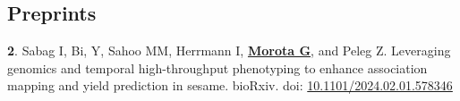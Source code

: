 \documentclass[margin,line,10pt]{res}
\newenvironment{list1}{
  \begin{list}{\ding{113}}{%
      \setlength{\itemsep}{0in}
      \setlength{\parsep}{0in} \setlength{\parskip}{0in}
      \setlength{\topsep}{0in} \setlength{\partopsep}{0in} 
      \setlength{\leftmargin}{0.17in}}}{\end{list}}
\begin{document}
\begin{resume}
\begin{comment}
\vspace{0.5cm}
\section{\sc Manuscripts under review}

\begin{list1}


 \item  [{\bf 65}.] Habimana V, Nguluma AS, Nziku ZC, Ekine-Dzivenu CC, Morota G, Mrode R, and Chenyambuga SW. Effects of temperature-humidity index on milk metabolites identified in raw milk of Tanzanian Holstein Friesian dairy cattle by liquid chromatography-tandem mass spectrometry.


 \item  [{\bf 65}.] Habimana V, Nguluma AS, Nziku ZC, Ekine-Dzivenu CC, Morota G, Mrode R, and Chenyambuga SW. Heat stress effects on physiological and milk yield traits of Holstein Friesian dairy cattle genotypes reared in Tanga region, Tanzania.

       \vspace{0.5cm}

\item  [{\bf 65}.] Sandhu J, Irvin L, Oguro S, Chandaran AK, Paul P, Dhatt B, Hussain W, Cunningham SS, Quinones CO, Lorence A, Adviento-Borbe MA, Staswick P, \textbf{\underline{Morota G}}, and Walia H. 2023. Natural variation in {\it LONELY GUY-like 1} regulates rice grain weight under nighttime temperature.     

    
    \end{list1}
\end{comment}


\vspace{0.5cm}
\section{\sc Preprints}
\begin{list1}

  \item  [{\bf 2}.] Sabag I, Bi, Y, Sahoo MM, Herrmann I, \textbf{\underline{Morota G}}, and Peleg Z. Leveraging genomics and temporal high-throughput phenotyping to enhance association mapping and yield prediction in sesame. bioRxiv. doi: \textcolor{blue}{\href{https://doi.org/10.1101/2024.02.01.578346}{10.1101/2024.02.01.578346}}


\end{list1}
\end{resume}
\end{document}
